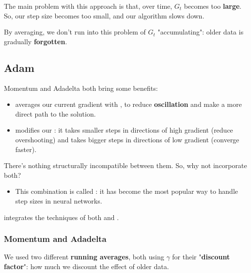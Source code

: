             The main problem with this approach is that, over time, $G_t$ becomes too \textbf{large}. So, our step size becomes too small, and our algorithm slows down.

            By averaging, we don't run into this problem of $G_t$ "accumulating": older data is gradually \textbf{forgotten}.

    \pagebreak
    \subsection{Adam}

        Momentum and Adadelta both bring some benefits:

        \begin{itemize}
            \item {} averages our current gradient with , to reduce \textbf{oscillation} and make a more direct path to the solution.
            
            \item {} modifies our : it takes smaller steps in directions of high gradient (reduce overshooting) and takes bigger steps in directions of low gradient (converge faster).
        \end{itemize}

        There's nothing structurally incompatible between them. So, why not incorporate both?

        \begin{itemize}
            \item This combination is called : it has become the most popular way to handle step sizes in neural networks.\\
        \end{itemize}

        \begin{concept}
             integrates the techniques of both  and .
        \end{concept}

        \phantom{}

        \subsubsection{Momentum and Adadelta}

            We used two different \textbf{running averages}, both using $\gamma$ for their "\textbf{discount factor}": how much we discount the effect of older data.
    
